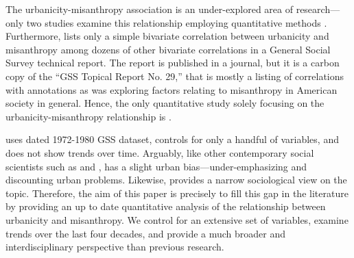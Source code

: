 \documentclass[11pt, letterpaper]{article}
\begin{document}
\begin{spacing}{1.4}
The urbanicity-misanthropy association is an under-explored area of research---only two studies examine this relationship employing quantitative methods \citep{wilson85,smith97}. Furthermore, \citet{smith97} lists only a simple bivariate correlation between urbanicity and misanthropy among dozens of other bivariate correlations in a General Social Survey technical report. The report is published in a journal, but it is a carbon copy of the ``GSS Topical Report No. 29,'' that is mostly a listing of correlations with annotations as \citet{smith97} was exploring factors relating to misanthropy in American society in general.
Hence, the only quantitative study solely focusing on the urbanicity-misanthropy relationship is \citet{wilson85}.%
%

\citet{wilson85} uses dated 1972-1980 GSS dataset, controls for only a
handful of variables, and does not show trends over time.  Arguably, like other contemporary social scientists such as \citet[e.g.,][]{veenhoven94,meyer13} and \citet[e.g.,][]{fischer82}, \citeauthor{wilson85} has a slight urban bias---under-emphasizing and discounting urban problems. Likewise, \citet{wilson85} provides a narrow sociological view on the topic. Therefore, the aim of this paper is precisely to fill this gap in the literature by providing an up to date quantitative analysis of the relationship between urbanicity and misanthropy. We control  for an extensive set of variables, examine trends over the last four decades, and provide a much broader and interdisciplinary perspective than previous research. 


\end{spacing}
\end{document}
